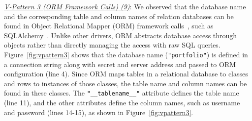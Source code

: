 \textit{\uline{V-Pattern 3 (ORM Framework Calls) (9)}}: We observed that the database name and the corresponding table and column names of relation databases can be found in Object Relational Mapper (ORM) framework calls~\cite{ORM}, such as SQLAlchemy~\cite{sqlalchemy}. Unlike other drivers, ORM abstracts database access through objects rather than directly managing the access with raw SQL queries. Figure~\ref{fig:vpattern3} shows that the database name (\texttt{"portfolio"}) is defined in a connection string along with secret and server address and passed to ORM configuration (line 4). Since ORM maps tables in a relational database to classes and rows to instances of those classes, the table name and column names can be found in these classes. The \texttt{"\_\_tablename\_\_"} attribute defines the table name (line 11), and the other attributes define the column names, such as username and password (lines 14-15), as shown in Figure~\ref{fig:vpattern3}.



